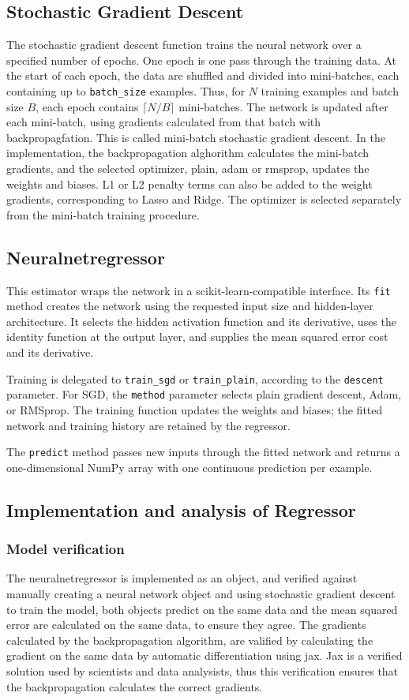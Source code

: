 \subsection{Stochastic Gradient Descent}
The stochastic gradient descent function trains the neural network over a specified 
number of epochs. One epoch is one pass through the training data. 
At the start of each epoch, the data are shuffled and divided into mini-batches, 
each containing up to \texttt{batch\_size} examples. 
Thus, for \(N\) training examples and batch size \(B\), each epoch contains 
\(\lceil N/B\rceil\) mini-batches. 
The network is updated after each mini-batch, using gradients calculated 
from that batch with backpropagfation. 
This is called mini-batch stochastic gradient descent.
In the implementation, the backpropagation alghorithm calculates the mini-batch gradients, 
and the selected optimizer, plain, adam or rmsprop, updates the weights and biases.
L1 or L2 penalty terms can also be added to the weight gradients, corresponding to Lasso and Ridge. 
The optimizer is selected separately from the mini-batch training procedure.
\subsection{Neuralnetregressor}
This estimator wraps the network in a scikit-learn-compatible interface. Its
\texttt{fit} method creates the network using the requested input size and
hidden-layer architecture. It selects the hidden activation function and its
derivative, uses the identity function at the output layer, and supplies the
mean squared error cost and its derivative.

Training is delegated to \texttt{train\_sgd} or \texttt{train\_plain},
according to the \texttt{descent} parameter. For SGD, the \texttt{method}
parameter selects plain gradient descent, Adam, or RMSprop. The training
function updates the weights and biases; the fitted network and training
history are retained by the regressor.

The \texttt{predict} method passes new inputs through the fitted network and
returns a one-dimensional NumPy array with one continuous prediction per
example.
\subsection{Implementation and analysis of Regressor}
\subsubsection{Model verification}
The neuralnetregressor is implemented as an object, and verified against manually 
creating a neural network object and using stochastic gradient descent
to train the model, both objects predict on the same data and the 
mean squared error are calculated on the same data, to ensure they agree. 
The gradients calculated by the backpropagation algorithm, 
are valified by calculating the gradient on the same data by
automatic differentiation using jax. Jax is a verified solution
used by scientists and data analysists, thus this verification ensures
that the backpropagation calculates the correct gradients.
